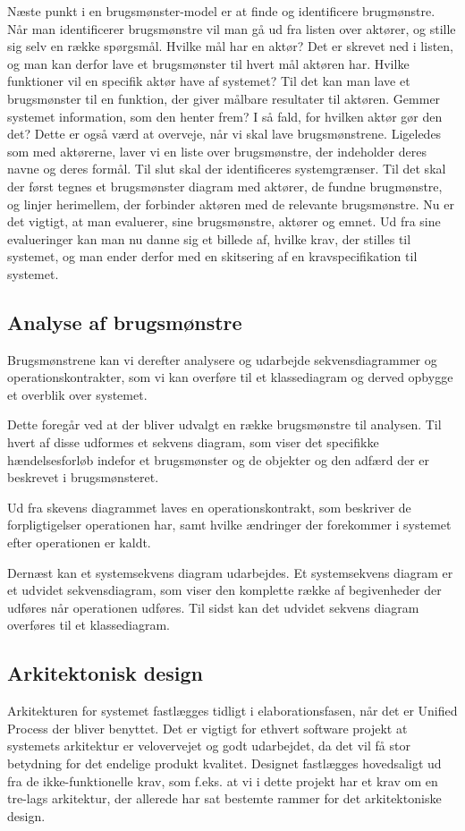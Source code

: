 Næste punkt i en brugsmønster-model er at finde og identificere brugmønstre.
Når man identificerer brugsmønstre vil man gå ud fra listen over aktører, og stille sig selv en række spørgsmål. Hvilke mål har en aktør? Det er skrevet ned i listen, og man kan derfor lave et brugsmønster til hvert mål aktøren har. Hvilke funktioner vil en specifik aktør have af systemet? Til det kan man lave et brugsmønster til en funktion, der giver målbare resultater til aktøren. Gemmer systemet information, som den henter frem? I så fald, for hvilken aktør gør den det? Dette er også værd at overveje, når vi skal lave brugsmønstrene. Ligeledes som med aktørerne, laver vi en liste over brugsmønstre, der indeholder deres navne og deres formål.
Til slut skal der identificeres systemgrænser. Til det skal der først tegnes et brugsmønster diagram med aktører, de fundne brugmønstre, og linjer herimellem, der forbinder aktøren med de relevante brugsmønstre. Nu er det vigtigt, at man evaluerer, sine brugsmønstre, aktører og emnet. Ud fra sine evalueringer kan man nu danne sig et billede af, hvilke krav, der stilles til systemet, og man ender derfor med en skitsering af en kravspecifikation til systemet.


\subsection{Analyse af brugsmønstre}
Brugsmønstrene kan vi derefter analysere og udarbejde sekvensdiagrammer og operationskontrakter, som vi kan overføre til et klassediagram og derved opbygge et overblik over systemet. 

Dette foregår ved at der bliver udvalgt en række brugsmønstre til analysen. Til hvert af disse udformes et sekvens diagram, som viser det specifikke hændelsesforløb indefor et brugsmønster og de objekter og den adfærd der er beskrevet i brugsmønsteret. 

Ud fra skevens diagrammet laves en operationskontrakt, som beskriver de forpligtigelser operationen har, samt hvilke ændringer der forekommer i systemet efter operationen er kaldt. 

Dernæst kan et systemsekvens diagram udarbejdes. Et systemsekvens diagram er et udvidet sekvensdiagram, som viser den komplette række af begivenheder der udføres når operationen udføres. Til sidst kan det udvidet sekvens diagram overføres til et klassediagram. 


\subsection{Arkitektonisk design}
Arkitekturen for systemet fastlægges tidligt i elaborationsfasen, når det er Unified Process der bliver benyttet. Det er vigtigt for ethvert software projekt at systemets arkitektur er velovervejet og godt udarbejdet, da det vil få stor betydning for det endelige produkt kvalitet. Designet fastlægges hovedsaligt ud fra de ikke-funktionelle krav, som f.eks. at vi i dette projekt har et krav om en tre-lags arkitektur, der allerede har sat bestemte rammer for det arkitektoniske design. 


